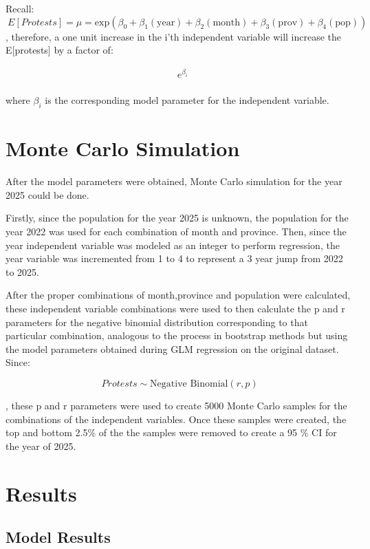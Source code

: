 \documentclass{article}
\begin{document}
Recall: 
$$
  \ E[Protests] = \mu = \text{exp}\left(\beta_0 + \beta_1 (\mathrm{year}) + \beta_2 (\mathrm{month}) + \beta_3 (\mathrm{prov}) + \beta_4 (\mathrm{pop})\right)
$$
, therefore, a one unit increase in the i'th independent variable will increase the E[protests] by a factor of:

\begin{equation*}
\begin{aligned}
& e^{\beta_i} \\
\end{aligned}
\end{equation*}

where \(\beta_i\) is the corresponding model parameter for the independent variable.

\section{Monte Carlo Simulation}

    After the model parameters were obtained, Monte Carlo simulation for the year 2025 could be done. 

    Firstly, since the population for the year 2025 is unknown, the population for the year 2022 was used for each combination of month and province. Then, since the year independent variable was modeled as an integer to perform regression, the year variable was incremented from 1 to 4 to represent a 3 year jump from 2022 to 2025.   

    After the proper combinations of month,province and population were calculated, these independent variable combinations were used to then calculate the p and r parameters for the negative binomial distribution corresponding to that particular combination, analogous to the process in bootstrap methods but using the model parameters obtained during GLM regression on the original dataset. Since:

\[\ Protests \sim \text{Negative Binomial}(r, p) \]

, these p and r parameters were used to create 5000 Monte Carlo samples for the combinations of the independent variables. Once these samples were created, the top and bottom 2.5\% of the the samples were removed to create a 95 \% CI for the year of 2025. 


\section{Results}

\subsection{Model Results}
\end{document}
